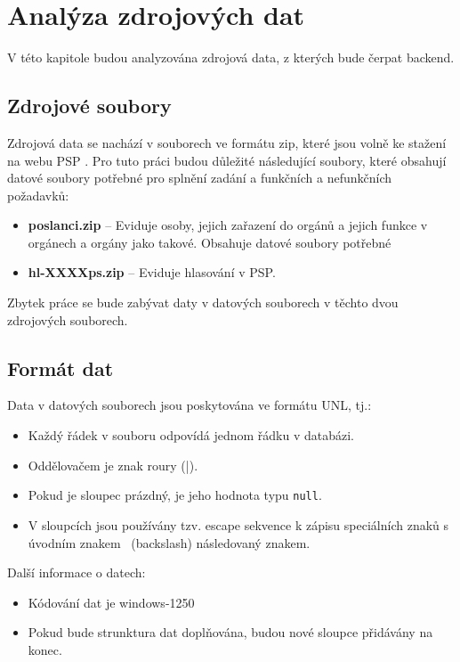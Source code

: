 \chapter{Analýza zdrojových dat}
\label{ch:analysis_data}

\begin{chapterabstract}
	V této kapitole budou analyzována zdrojová data, z kterých bude čerpat backend.
\end{chapterabstract}

\section{Zdrojové soubory}

Zdrojová data se nachází v souborech ve formátu zip, které jsou volně ke stažení na webu PSP \cite{psp-data}. Pro tuto práci budou důležité následující soubory, které obsahují datové soubory potřebné pro splnění zadání a funkčních a nefunkčních požadavků:

\begin{itemize}
	\item \textbf{poslanci.zip} -- Eviduje osoby, jejich zařazení do orgánů a jejich funkce v orgánech a orgány jako takové. Obsahuje datové soubory potřebné 
	\item \textbf{hl-XXXXps.zip} -- Eviduje hlasování v PSP.
\end{itemize}

\noindent Zbytek práce se bude zabývat daty v datových souborech v těchto dvou zdrojových souborech.

\section{Formát dat}
Data v datových souborech jsou poskytována ve formátu UNL, tj.:

\begin{itemize}
	\item Každý řádek v souboru odpovídá jednom řádku v databázi.
	\item Oddělovačem je znak roury (|).
	\item Pokud je sloupec prázdný, je jeho hodnota typu \lstinline|null|.
	\item V sloupcích jsou používány tzv. escape sekvence k zápisu speciálních znaků s úvodním znakem \ (backslash) následovaný znakem.
\end{itemize}

\noindent Další informace o datech:

\begin{itemize}
	\item Kódování dat je windows-1250
	\item Pokud bude strunktura dat doplňována, budou nové sloupce přidávány na konec.
\end{itemize}

